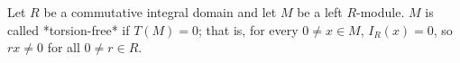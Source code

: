 Let $R$ be a commutative integral domain and let $M$ be a left $R$-module. $M$ is called *torsion-free* if $T(M) = 0$; that is, for every $0 \neq x \in M$, $I_R(x) = 0$, so $rx \neq 0$ for all $0 \neq r \in R$.
